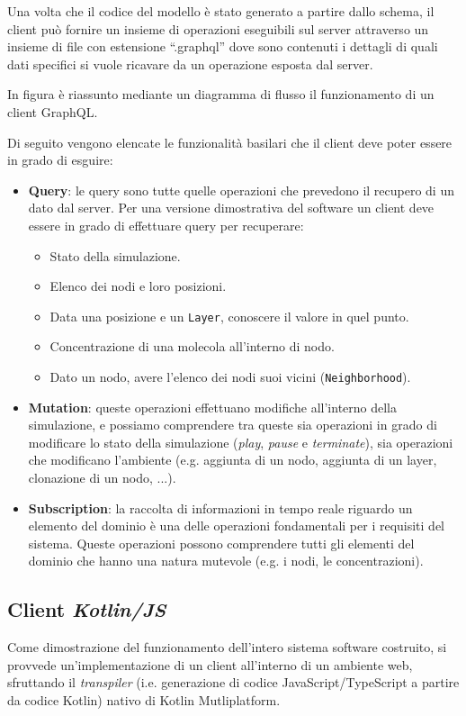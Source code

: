 Una volta che il codice del modello è stato generato a partire dallo schema, il client può fornire un insieme di operazioni eseguibili sul server attraverso
un insieme di file con estensione ``.graphql'' dove sono contenuti i dettagli di quali dati specifici si vuole ricavare da un operazione esposta dal server.

In figura  è riassunto mediante un diagramma di flusso il funzionamento di un client GraphQL.

Di seguito vengono elencate le funzionalità basilari che il client deve poter essere in grado di esguire:
\begin{itemize}
    \item \textbf{Query}: le query sono tutte quelle operazioni che prevedono il recupero di un dato dal server. Per una versione dimostrativa del software
        un client deve essere in grado di effettuare query per recuperare:
        \begin{itemize}
            \item Stato della simulazione.
            \item Elenco dei nodi e loro posizioni.
            \item Data una posizione e un \texttt{Layer}, conoscere il valore in quel punto.
            \item Concentrazione di una molecola all'interno di nodo.
            \item Dato un nodo, avere l'elenco dei nodi suoi vicini (\texttt{Neighborhood}).
        \end{itemize}
    \item \textbf{Mutation}: queste operazioni effettuano modifiche all'interno della simulazione, e possiamo comprendere tra queste sia operazioni
        in grado di modificare lo stato della simulazione (\textit{play}, \textit{pause} e \textit{terminate}), sia operazioni che modificano l'ambiente
        (e.g. aggiunta di un nodo, aggiunta di un layer, clonazione di un nodo, ...).
    \item \textbf{Subscription}: la raccolta di informazioni in tempo reale riguardo un elemento del dominio è una delle operazioni fondamentali per i
        requisiti del sistema. Queste operazioni possono comprendere tutti gli elementi del dominio che hanno una natura mutevole (e.g. i nodi, le concentrazioni).
\end{itemize}

\subsection{Client \textit{Kotlin/JS}}\label{ssec:kt-js-client}
Come dimostrazione del funzionamento dell'intero sistema software costruito, si provvede un'implementazione di un client all'interno di un ambiente
web, sfruttando il \textit{transpiler} (i.e. generazione di codice JavaScript/TypeScript a partire da codice Kotlin) nativo di Kotlin Mutliplatform.
